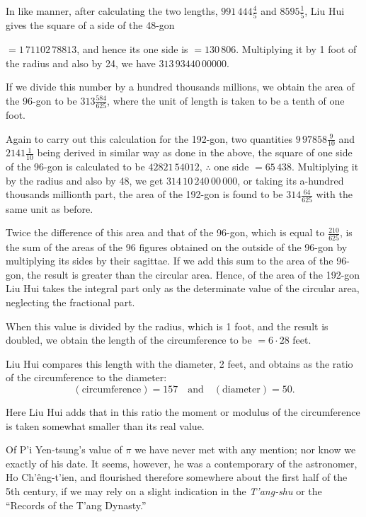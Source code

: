 \documentclass[11pt]{article}
\newcommand{\scanpage}[2]{\clearpage\setcounter{footnote}{0}\noindent{\footnotesize\color{gray}PDF page #1 · #2}\par\medskip}
\newcommand{\scanfooter}{}
\begin{document}
In like manner, after calculating the two lengths, $991\,444\frac{4}{5}$ and $8595\frac{1}{5}$, Liu Hui gives the square of a side of the 48-gon
\scanfooter

\scanpage{0063}{Chapter 7, printed page 49}
\setcounter{footnote}{0}
$=1\,71102\,78813$, and hence its one side is $=130\,806$. Multiplying it by 1 foot of the radius and also by 24, we have $313\,93440\,00000$.

If we divide this number by a hundred thousands millions, we obtain the area of the 96-gon to be $313\frac{584}{625}$, where the unit of length is taken to be a tenth of one foot.

Again to carry out this calculation for the 192-gon, two quantities $9\,97858\frac{9}{10}$ and $2141\frac{1}{10}$ being derived in similar way as done in the above, the square of one side of the 96-gon is calculated to be $42821\,54012$, $\therefore$ one side $=65\,438$. Multiplying it by the radius and also by 48, we get $314\,10\,240\,00\,000$, or taking its a-hundred thousands millionth part, the area of the 192-gon is found to be $314\frac{64}{625}$ with the same unit as before.

Twice the difference of this area and that of the 96-gon, which is equal to $\frac{210}{625}$, is the sum of the areas of the 96 figures obtained on the outside of the 96-gon by multiplying its sides by their sagittae. If we add this sum to the area of the 96-gon, the result is greater than the circular area. Hence, of the area of the 192-gon Liu Hui takes the integral part only as the determinate value of the circular area, neglecting the fractional part.

When this value is divided by the radius, which is 1 foot, and the result is doubled, we obtain the length of the circumference to be $=6\cdot28$ feet.

Liu Hui compares this length with the diameter, 2 feet, and obtains as the ratio of the circumference to the diameter:
\[
(\text{circumference})=157\quad\text{and}\quad(\text{diameter})=50.
\]

Here Liu Hui adds that in this ratio the moment or modulus of the circumference is taken somewhat smaller than its real value.

Of P'i Yen-tsung's value of $\pi$ we have never met with any mention; nor know we exactly of his date. It seems, however, he was a contemporary of the astronomer, Ho Ch'êng-t'ien, and flourished therefore somewhere about the first half of the 5th century, if we may rely on a slight indication in the \emph{T'ang-shu} or the ``Records of the T'ang Dynasty.''
\end{document}
